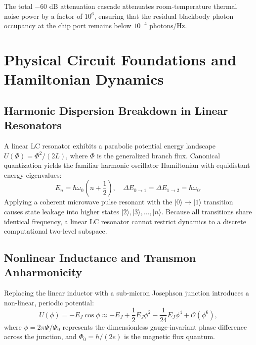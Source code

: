 \documentclass[10pt,journal,compsoc]{IEEEtran}
\begin{document}
The total $-60\text{ dB}$ attenuation cascade attenuates room-temperature thermal noise power by a factor of $10^6$, ensuring that the residual blackbody photon occupancy at the chip port remains below $10^{-4}$ photons/Hz.

\section{Physical Circuit Foundations and Hamiltonian Dynamics}

\subsection{Harmonic Dispersion Breakdown in Linear Resonators}
A linear LC resonator exhibits a parabolic potential energy landscape $U(\Phi) = \Phi^2 / (2L)$, where $\Phi$ is the generalized branch flux. Canonical quantization yields the familiar harmonic oscillator Hamiltonian with equidistant energy eigenvalues:
\begin{equation}
E_n = \hbar \omega_0 \left(n + \frac{1}{2}\right), \quad \Delta E_{0\to 1} = \Delta E_{1\to 2} = \hbar \omega_0.
\end{equation}
Applying a coherent microwave pulse resonant with the $|0\rangle \to |1\rangle$ transition causes state leakage into higher states $|2\rangle, |3\rangle, \dots, |n\rangle$. Because all transitions share identical frequency, a linear LC resonator cannot restrict dynamics to a discrete computational two-level subspace.

\subsection{Nonlinear Inductance and Transmon Anharmonicity}
Replacing the linear inductor with a sub-micron Josephson junction introduces a non-linear, periodic potential:
\begin{equation}
U(\phi) = -E_J \cos\phi \approx -E_J + \frac{1}{2} E_J \phi^2 - \frac{1}{24} E_J \phi^4 + \mathcal{O}(\phi^6),
\end{equation}
where $\phi = 2\pi\Phi/\Phi_0$ represents the dimensionless gauge-invariant phase difference across the junction, and $\Phi_0 = h/(2e)$ is the magnetic flux quantum.
\end{document}
